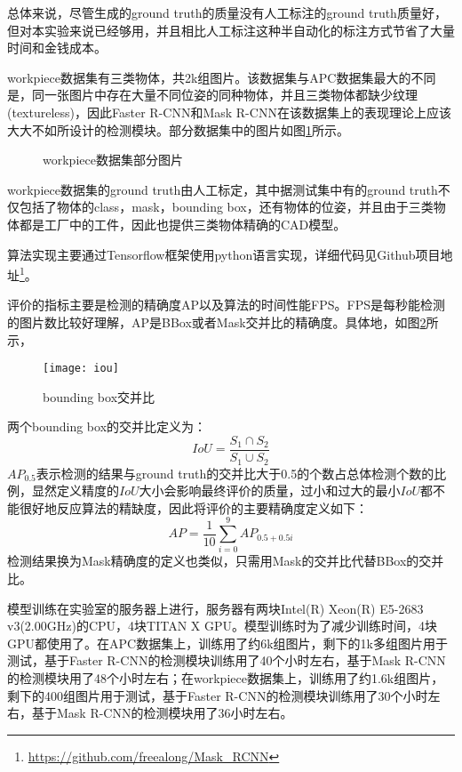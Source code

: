 总体来说，尽管生成的ground truth的质量没有人工标注的ground truth质量好，但对本实验来说已经够用，并且相比人工标注这种半自动化的标注方式节省了大量时间和金钱成本。

workpiece数据集有三类物体，共2k组图片。该数据集与APC数据集最大的不同是，同一张图片中存在大量不同位姿的同种物体，并且三类物体都缺少纹理(textureless)，因此Faster R-CNN和Mask R-CNN在该数据集上的表现理论上应该大大不如所设计的检测模块。部分数据集中的图片如图\ref{fig:wp_dataset}所示。
\begin{figure}[ht]
  \centering
  \hskip0.2cm
  \hskip0.2cm
  \vfill
  \hskip0.2cm
  \hskip0.2cm
  \caption{workpiece数据集部分图片}
  \label{fig:wp_dataset}
\end{figure}
workpiece数据集的ground truth由人工标定，其中据测试集中有的ground truth不仅包括了物体的class，mask，bounding box，还有物体的位姿，并且由于三类物体都是工厂中的工件，因此也提供三类物体精确的CAD模型。

{\kai 算法实现}主要通过Tensorflow框架使用python语言实现，详细代码见Github项目地址\footnote{\url{https://github.com/freealong/Mask\_RCNN}}。

{\kai 评价的指标}主要是检测的精确度AP以及算法的时间性能FPS。FPS是每秒能检测的图片数比较好理解，AP是BBox或者Mask交并比的精确度。具体地，如图\ref{fig:iou}所示，
\begin{figure}[ht]
  \centering
  \texttt{[image: iou]}
  \caption{bounding box交并比}
  \label{fig:iou}
\end{figure}
两个bounding box的交并比定义为：
\begin{equation}
  IoU = \frac{S_1\cap S_2}{S_1\cup S_2}
\end{equation}
$AP_{0.5}$表示检测的结果与ground truth的交并比大于0.5的个数占总体检测个数的比例，显然定义精度的$IoU$大小会影响最终评价的质量，过小和过大的最小$IoU$都不能很好地反应算法的精缺度，因此将评价的主要精确度定义如下：
\begin{equation}
  AP = \frac{1}{10}\sum_{i=0}^{9}{AP_{0.5 + 0.5i}}
\end{equation}
检测结果换为Mask精确度的定义也类似，只需用Mask的交并比代替BBox的交并比。

{\kai 模型训练}在实验室的服务器上进行，服务器有两块Intel(R) Xeon(R) E5-2683 v3(2.00GHz)的CPU，4块TITAN X GPU。模型训练时为了减少训练时间，4块GPU都使用了。在APC数据集上，训练用了约6k组图片，剩下的1k多组图片用于测试，基于Faster R-CNN的检测模块训练用了40个小时左右，基于Mask R-CNN的检测模块用了48个小时左右；在workpiece数据集上，训练用了约1.6k组图片，剩下的400组图片用于测试，基于Faster R-CNN的检测模块训练用了30个小时左右，基于Mask R-CNN的检测模块用了36小时左右。


